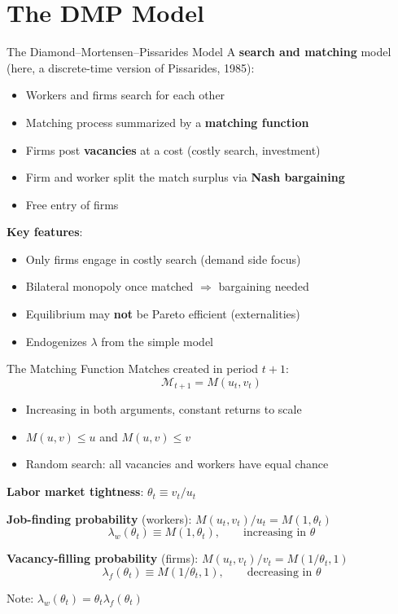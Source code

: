 \documentclass[blue]{beamer}
\begin{document}
\section{The DMP Model}

\begin{frame}{The Diamond--Mortensen--Pissarides Model}
	A \textbf{search and matching} model (here, a discrete-time version of Pissarides, 1985):
	\begin{itemize}
		\item Workers and firms search for each other
		\item Matching process summarized by a \textbf{matching function}
		\item Firms post \textbf{vacancies} at a cost (costly search, investment)
		\item Firm and worker split the match surplus via \textbf{Nash bargaining}
		\item Free entry of firms
	\end{itemize}
	
	\bigskip
	\textbf{Key features}:
	\begin{itemize}
		\item Only firms engage in costly search (demand side focus)
		\item Bilateral monopoly once matched $\Rightarrow$ bargaining needed
		\item Equilibrium may \textbf{not} be Pareto efficient (externalities)
		\item Endogenizes $\lambda$ from the simple model
	\end{itemize}
\end{frame}

\begin{frame}{The Matching Function}
	Matches created in period $t+1$:
	\[
	\mathcal{M}_{t+1} = M(u_t, v_t)
	\]
	
	\begin{itemize}
		\item Increasing in both arguments, constant returns to scale
		\item $M(u, v) \leq u$ and $M(u, v) \leq v$
		\item Random search: all vacancies and workers have equal chance
	\end{itemize}

	\textbf{Labor market tightness}: $\theta_t \equiv v_t / u_t$
	
	\textbf{Job-finding probability} (workers): $M(u_t,v_t)/u_t=M(1,\theta_t)$
	\[
	\lambda_w(\theta_t) \equiv M(1, \theta_t), \qquad \text{increasing in } \theta
	\]
	
	\textbf{Vacancy-filling probability} (firms):    $M(u_t,v_t)/v_t=M(1/\theta_t,1)$
	\[
	\lambda_f(\theta_t) \equiv M(1/\theta_t, 1), \qquad \text{decreasing in } \theta
	\]
	
	Note: $\lambda_w(\theta_t) = \theta_t \lambda_f(\theta_t)$
\end{frame}
\end{document}
